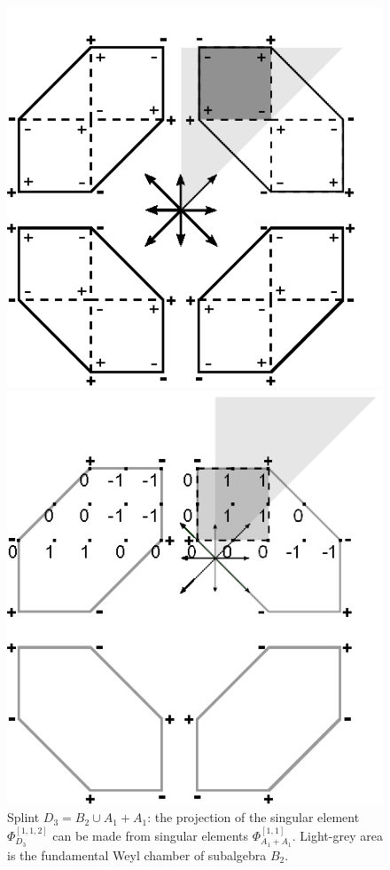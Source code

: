 \documentclass[12pt]{article}
\begin{document}
\begin{figure}[h]
\begin{center}
\begin{minipage}[h]{0.5\linewidth}
\includegraphics[width=0.95\linewidth]{drawing-1}
\caption{Splint $D_3= B_2\cup A_1+A_1$: the projection of the singular element $\Phi_{D_3}^{[1,1,2]}$ can be made from singular elements $\Phi_{A_1+A_1}^{[1,1]}$. Light-grey area is the fundamental Weyl chamber of subalgebra $B_2$.} 
\label{ris1} 
\end{minipage}
\hfill
\begin{minipage}[h]{0.47\linewidth}
\includegraphics[width=0.9\linewidth,viewport=0 0 157 157,clip]{drawing-3}

\end{minipage}
\end{center}
\end{figure}
\end{document}
